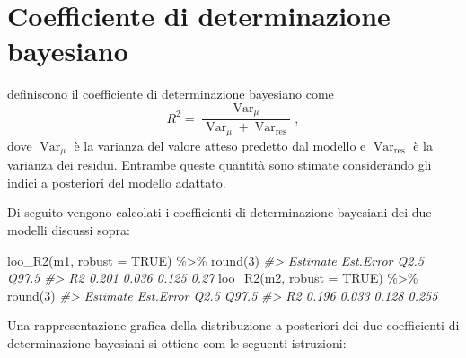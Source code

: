 \documentclass[
  10pt,
  italian,
  a4paper,
  extrafontsizes,onecolumn,openright
  ]{memoir}
\newenvironment{Shaded}{\begin{snugshade}}{\end{snugshade}}
\newcommand{\AttributeTok}[1]{\textcolor[rgb]{0.77,0.63,0.00}{#1}}
\newcommand{\CommentTok}[1]{\textcolor[rgb]{0.56,0.35,0.01}{\textit{#1}}}
\newcommand{\ConstantTok}[1]{\textcolor[rgb]{0.00,0.00,0.00}{#1}}
\newcommand{\DecValTok}[1]{\textcolor[rgb]{0.00,0.00,0.81}{#1}}
\newcommand{\FunctionTok}[1]{\textcolor[rgb]{0.00,0.00,0.00}{#1}}
\newcommand{\NormalTok}[1]{#1}
\newcommand{\SpecialCharTok}[1]{\textcolor[rgb]{0.00,0.00,0.00}{#1}}
\DeclareMathOperator{\Var}{Var} %
\theoremstyle{definition}
\theoremstyle{definition}
\theoremstyle{definition}
\theoremstyle{definition}
\theoremstyle{remark}
\begin{document}
\hypertarget{coefficiente-di-determinazione-bayesiano}{%
\section{Coefficiente di determinazione bayesiano}\label{coefficiente-di-determinazione-bayesiano}}

\textcite{gelman2019r} definiscono il \href{https://avehtari.github.io/bayes_R2/bayes_R2.html}{coefficiente di determinazione bayesiano} come
\begin{equation}
R^2 = \frac{\Var_{\mu}}{\Var_{\mu} + \Var_{\text{res}}},
\end{equation}
dove \(\Var_{\mu}\) è la varianza del valore atteso predetto dal modello e \(\Var_{\text{res}}\) è la varianza dei residui. Entrambe queste quantità sono stimate considerando gli indici a posteriori del modello adattato.

Di seguito vengono calcolati i coefficienti di determinazione bayesiani dei due modelli discussi sopra:

\begin{Shaded}
\begin{Highlighting}[]
\FunctionTok{loo\_R2}\NormalTok{(m1, }\AttributeTok{robust =} \ConstantTok{TRUE}\NormalTok{) }\SpecialCharTok{\%\textgreater{}\%}
  \FunctionTok{round}\NormalTok{(}\DecValTok{3}\NormalTok{)}
\CommentTok{\#\textgreater{}    Estimate Est.Error  Q2.5 Q97.5}
\CommentTok{\#\textgreater{} R2    0.201     0.036 0.125  0.27}
\FunctionTok{loo\_R2}\NormalTok{(m2, }\AttributeTok{robust =} \ConstantTok{TRUE}\NormalTok{) }\SpecialCharTok{\%\textgreater{}\%}
  \FunctionTok{round}\NormalTok{(}\DecValTok{3}\NormalTok{)}
\CommentTok{\#\textgreater{}    Estimate Est.Error  Q2.5 Q97.5}
\CommentTok{\#\textgreater{} R2    0.196     0.033 0.128 0.255}
\end{Highlighting}
\end{Shaded}

\noindent
Una rappresentazione grafica della distribuzione a posteriori dei due coefficienti di determinazione bayesiani si ottiene com le seguenti istruzioni:
\end{document}
